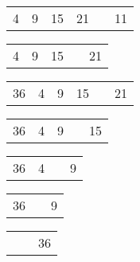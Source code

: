 \documentclass[11pt,a4paper]{article}
\begin{document}
\begin{center}
\begin{table}[ht!]
\begin{minipage}{0.45\textwidth}
\begin{tabular}{ |C{0.5cm}|C{0.5cm}|C{0.5cm}|C{0.5cm}| C{0.1cm} L{2cm} }
4 & 9 & 15 & 21 & & 11 \\
\end{tabular}

\bigskip

\begin{tabular}{ |C{0.5cm}|C{0.5cm}|C{0.5cm}| C{1cm} L{2cm} }
4 & 9 & 15 & & 21 \\
\end{tabular}

\bigskip

\begin{tabular}{ |C{0.5cm}|C{0.5cm}|C{0.5cm}|C{0.5cm}| C{0.1cm} L{2cm} }
36 & 4 & 9 & 15 & & 21 \\
\end{tabular}

\bigskip

\begin{tabular}{ |C{0.5cm}|C{0.5cm}|C{0.5cm}| C{1cm} L{2cm} }
36 & 4 & 9 & & 15 \\
\end{tabular}

\bigskip

\begin{tabular}{ |C{0.5cm}|C{0.5cm}| C{2cm} L{2cm} }
36 & 4 & & 9 \\
\end{tabular}

\bigskip

\begin{tabular}{ |C{0.5cm}| C{3cm} L{2cm} }
36 & & 9 \\
\end{tabular}

\bigskip

\begin{tabular}{ |C{0.5cm}| C{3cm} L{2cm} }
 & & 36 \\
\end{tabular}

\bigskip

\begin{tabular}{ C{0.5cm} }
  \\
\end{tabular}

  \end{minipage}
\end{table}

\end{center}
\end{document}
